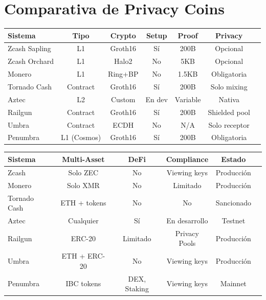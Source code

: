 \documentclass[11pt,a4paper,twoside]{book}
\begin{document}
\section{Comparativa de Privacy Coins}
\label{sec:comparativa-privacy}

\begin{center}
\small
\begin{tabular}{lcccccc}
\toprule
\textbf{Sistema} & \textbf{Tipo} & \textbf{Crypto} & \textbf{Setup} & \textbf{Proof} & \textbf{Privacy} \\
\midrule
Zcash Sapling & L1 & Groth16 & S\'i & 200B & Opcional \\
Zcash Orchard & L1 & Halo2 & No & 5KB & Opcional \\
Monero & L1 & Ring+BP & No & 1.5KB & Obligatoria \\
Tornado Cash & Contract & Groth16 & S\'i & 200B & Solo mixing \\
Aztec & L2 & Custom & En dev & Variable & Nativa \\
Railgun & Contract & Groth16 & S\'i & 200B & Shielded pool \\
Umbra & Contract & ECDH & No & N/A & Solo receptor \\
Penumbra & L1 (Cosmos) & Groth16 & S\'i & 200B & Obligatoria \\
\bottomrule
\end{tabular}
\end{center}

\begin{center}
\small
\begin{tabular}{lccccc}
\toprule
\textbf{Sistema} & \textbf{Multi-Asset} & \textbf{DeFi} & \textbf{Compliance} & \textbf{Estado} \\
\midrule
Zcash & Solo ZEC & No & Viewing keys & Producci\'on \\
Monero & Solo XMR & No & Limitado & Producci\'on \\
Tornado Cash & ETH + tokens & No & No & Sancionado \\
Aztec & Cualquier & S\'i & En desarrollo & Testnet \\
Railgun & ERC-20 & Limitado & Privacy Pools & Producci\'on \\
Umbra & ETH + ERC-20 & No & Viewing keys & Producci\'on \\
Penumbra & IBC tokens & DEX, Staking & Viewing keys & Mainnet \\
\bottomrule
\end{tabular}
\end{center}
\end{document}
